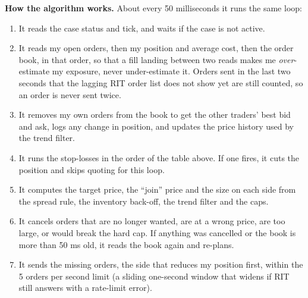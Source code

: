 \documentclass{article}
\begin{document}
\textbf{How the algorithm works.} About every 50 milliseconds it runs the same loop:
\begin{enumerate}
  \item It reads the case status and tick, and waits if the case is not active.
  \item It reads my open orders, then my position and average cost, then the order book, in that
        order, so that a fill landing between two reads makes me \emph{over}-estimate my exposure,
        never under-estimate it. Orders sent in the last two seconds that the lagging RIT order list
        does not show yet are still counted, so an order is never sent twice.
  \item It removes my own orders from the book to get the other traders' best bid and ask, logs any
        change in position, and updates the price history used by the trend filter.
  \item It runs the stop-losses in the order of the table above. If one fires, it cuts the position
        and skips quoting for this loop.
  \item It computes the target price, the ``join'' price and the size on each side from the spread
        rule, the inventory back-off, the trend filter and the caps.
  \item It cancels orders that are no longer wanted, are at a wrong price, are too large, or would break
        the hard cap. If anything was cancelled or the book is more than 50 ms old, it reads the book
        again and re-plans.
  \item It sends the missing orders, the side that reduces my position first, within the 5 orders per
        second limit (a sliding one-second window that widens if RIT still answers with a rate-limit
        error).
\end{enumerate}
\end{document}
